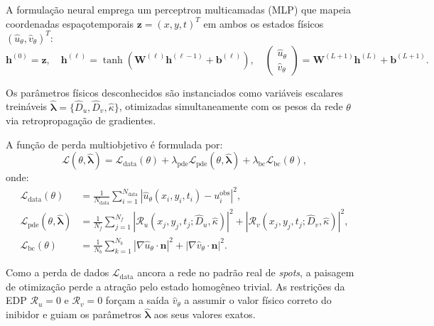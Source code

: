 \documentclass[a4paper, 12pt, twoside]{article}
\begin{document}
A formulação neural emprega um perceptron multicamadas (MLP) que mapeia coordenadas espaçotemporais
$\mathbf{z} = (x, y, t)^T$ em ambos os estados físicos $(\hat{u}_\theta, \hat{v}_\theta)^T$:
\begin{equation}
  \mathbf{h}^{(0)} = \mathbf{z}, \quad \mathbf{h}^{(\ell)} = \tanh\left(\mathbf{W}^{(\ell)}\mathbf{h}^{(\ell-1)} + \mathbf{b}^{(\ell)}\right), \quad \begin{pmatrix} \hat{u}_\theta \\ \hat{v}_\theta \end{pmatrix} = \mathbf{W}^{(L+1)}\mathbf{h}^{(L)} + \mathbf{b}^{(L+1)}.
\end{equation}

Os parâmetros físicos desconhecidos são instanciados como variáveis escalares treináveis
$\hat{\boldsymbol{\lambda}} = \{\hat{D}_u, \hat{D}_v, \hat{\kappa}\}$, otimizadas simultaneamente
com os pesos da rede $\theta$ via retropropagação de gradientes.

A função de perda multiobjetivo é formulada por:
\begin{equation}
  \mathcal{L}(\theta, \hat{\boldsymbol{\lambda}}) = \mathcal{L}_{\mathrm{data}}(\theta) + \lambda_{\mathrm{pde}}\mathcal{L}_{\mathrm{pde}}(\theta, \hat{\boldsymbol{\lambda}}) + \lambda_{\mathrm{bc}}\mathcal{L}_{\mathrm{bc}}(\theta), \label{eq:inverse_loss}
\end{equation}
onde:
\begin{align}
  \mathcal{L}_{\mathrm{data}}(\theta) &= \frac{1}{N_{\mathrm{data}}}\sum_{i=1}^{N_{\mathrm{data}}} \left| \hat{u}_\theta(x_i, y_i, t_i) - u_i^{\mathrm{obs}} \right|^2, \\
  \mathcal{L}_{\mathrm{pde}}(\theta, \hat{\boldsymbol{\lambda}}) &= \frac{1}{N_f}\sum_{j=1}^{N_f} \left|\mathcal{R}_u(x_j, y_j, t_j; \hat{D}_u, \hat{\kappa})\right|^2 + \left|\mathcal{R}_v(x_j, y_j, t_j; \hat{D}_v, \hat{\kappa})\right|^2, \\
  \mathcal{L}_{\mathrm{bc}}(\theta) &= \frac{1}{N_b}\sum_{k=1}^{N_b} \left|\nabla\hat{u}_\theta\cdot\mathbf{n}\right|^2 + \left|\nabla\hat{v}_\theta\cdot\mathbf{n}\right|^2.
\end{align}

Como a perda de dados $\mathcal{L}_{\mathrm{data}}$ ancora a rede no padrão real de \textit{spots},
a paisagem de otimização perde a atração pelo estado homogêneo trivial. As restrições da EDP
$\mathcal{R}_u = 0$ e $\mathcal{R}_v = 0$ forçam a saída $\hat{v}_\theta$ a assumir o valor físico
correto do inibidor e guiam os parâmetros $\hat{\boldsymbol{\lambda}}$ aos seus valores exatos.
\end{document}
